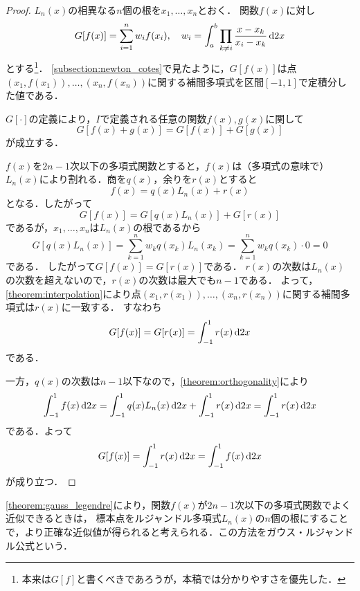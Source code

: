 \documentclass[a4paper]{ltjsarticle}
\theoremstyle{definition}
\newcommand{\dd}[1]{\dl2#1}
\begin{document}
\begin{proof}
  $L_n(x)$の相異なる$n$個の根を$x_1,\dots,x_n$とおく．
  関数$f(x)$に対し
  \[
    G[f(x)] = \sum_{i=1}^n w_i f(x_i),
    \quad w_i = \int_a^b \prod_{k\neq i} \frac{x - x_k}{x_i - x_k} \dd{x}
  \]
  とする\footnote{本来は$G[f]$と書くべきであろうが，本稿では分かりやすさを優先した．}．
  \cref{subsection:newton_cotes}で見たように，$G[f(x)]$は点$(x_1,f(x_1)),\dots,(x_n,f(x_n))$に関する補間多項式を区間$[-1, 1]$で定積分した値である．

  $G[\cdot]$の定義により，$I$で定義される任意の関数$f(x), g(x)$に関して
  \[
    G[f(x) + g(x)] = G[f(x)] + G[g(x)]
  \]
  が成立する．

  $f(x)$を$2n-1$次以下の多項式関数とすると，$f(x)$は（多項式の意味で）$L_n(x)$により割れる．商を$q(x)$，余りを$r(x)$とすると
  \[
    f(x) = q(x)L_n(x) + r(x)
  \]
  となる．したがって
  \[
    G[f(x)] = G[q(x)L_n(x)] + G[r(x)]
  \]
  であるが，$x_1,\dots,x_n$は$L_n(x)$の根であるから
  \[
    G[q(x)L_n(x)]
    = \sum_{k=1}^n w_k q(x_k) L_n(x_k)
    = \sum_{k=1}^n w_k q(x_k) \cdot 0
    = 0
  \]
  である．
  したがって$G[f(x)] = G[r(x)]$である．
  $r(x)$の次数は$L_n(x)$の次数を超えないので，$r(x)$の次数は最大でも$n-1$である．
  よって，\cref{theorem:interpolation}により点$(x_1,r(x_1)),\dots,(x_n,r(x_n))$に関する補間多項式は$r(x)$に一致する．
  すなわち
  \[
    G[f(x)] = G[r(x)] = \int_{-1}^1 r(x) \dd{x}
  \]
  である．

  一方，$q(x)$の次数は$n-1$以下なので，\cref{theorem:orthogonality}により
  \[
    \int_{-1}^1 f(x) \dd{x}
    = \int_{-1}^1 q(x)L_n(x) \dd{x} + \int_{-1}^1 r(x) \dd{x}
    = \int_{-1}^1 r(x) \dd{x}
  \]
  である．よって
  \[
    G[f(x)] = \int_{-1}^1 r(x) \dd{x} = \int_{-1}^1 f(x) \dd{x}
  \]
  が成り立つ．
\end{proof}

\cref{theorem:gauss_legendre}により，関数$f(x)$が$2n-1$次以下の多項式関数でよく近似できるときは，
標本点をルジャンドル多項式$L_n(x)$の$n$個の根にすることで，より正確な近似値が得られると考えられる．この方法をガウス・ルジャンドル公式という．
\end{document}
